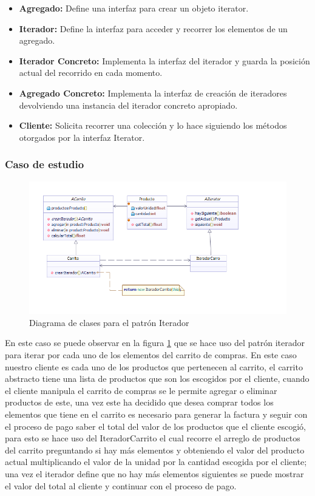 \begin{itemize}
	\item \textbf{Agregado: }Define una interfaz para crear un objeto iterator.
	\item \textbf{Iterador: }Define la interfaz para acceder y recorrer los elementos de un agregado.
	\item \textbf{Iterador Concreto: }Implementa la interfaz del iterador y guarda la posición actual del recorrido en cada momento.
	\item \textbf{Agregado Concreto: }Implementa la interfaz de creación de iteradores devolviendo una instancia del iterador concreto apropiado.
	\item \textbf{Cliente: }Solicita recorrer una colección y lo hace siguiendo los métodos otorgados por la interfaz Iterator. 
\end{itemize}

\subsubsection{Caso de estudio}

\begin{figure}[th!]
	\centering
	\includegraphics[width=0.9\linewidth]{arquitectura/imagenes/DiagramaIterador}
	\caption{Diagrama de clases para el patrón Iterador}
	\label{fig:patronIterador}
\end{figure}

En este caso se puede observar en la figura \ref{fig:patronIterador} que se hace uso del patrón iterador para iterar por cada uno de los elementos del carrito de compras. En este caso nuestro cliente es cada uno de los productos que pertenecen al carrito, el carrito abstracto tiene una lista de productos que son los escogidos por el cliente, cuando el cliente manipula el carrito de compras se le permite agregar o eliminar productos de este, una vez este ha decidido que desea comprar todos los elementos que tiene en el carrito es necesario para generar la factura y seguir con el proceso de pago saber el total del valor de los productos que el cliente escogió, para esto se hace uso del IteradorCarrito  el cual recorre el arreglo de productos del carrito preguntando si hay más elementos y obteniendo el valor del producto actual multiplicando el valor de la unidad por la cantidad escogida por el cliente; una vez el iterador define que no hay más elementos siguientes se puede mostrar el valor del total al cliente y continuar con el proceso de pago.



